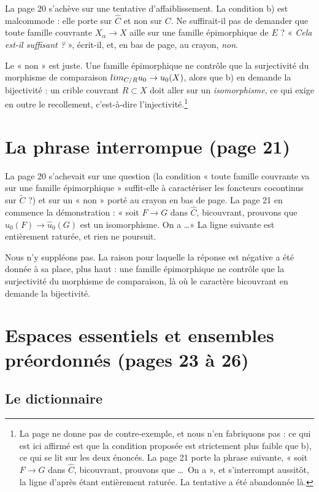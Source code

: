 \documentclass[11pt,a4paper]{article}
\begin{document}
La page 20 s'achève sur une tentative d'affaiblissement. La condition b) est
malcommode : elle porte sur $\widehat{C}$ et non sur $C$. Ne suffirait-il pas
de demander que toute famille couvrante $X_{\alpha} \to X$ aille sur une
famille épimorphique de $E$ ? « \emph{Cela est-il suffisant ?} », écrit-il,
et, en bas de page, au crayon, \emph{non}.

Le « non » est juste. Une famille épimorphique ne contrôle que la surjectivité
du morphisme de comparaison $\varinjlim_{C/R} u_{0} \to u_{0}(X)$, alors que
b) en demande la bijectivité : un crible couvrant $R \subset X$ doit aller sur
un \emph{isomorphisme}, ce qui exige en outre le recollement, c'est-à-dire
l'injectivité.\footnote{La page ne donne pas de contre-exemple, et nous n'en
fabriquons pas : ce qui est ici affirmé est que la condition proposée est
strictement plus faible que b), ce qui se lit sur les deux énoncés. La page 21
porte la phrase suivante, « soit $F \to G$ dans $\widehat{C}$,
bicouvrant, prouvons que \ldots\ On a », et s'interrompt aussitôt, la
ligne d'après étant entièrement raturée. La tentative a été abandonnée là.}

\section*{La phrase interrompue (page 21)}

La page 20 s'achevait sur une question (la condition « toute famille
couvrante va sur une famille épimorphique » suffit-elle à caractériser les
foncteurs cocontinus sur $\widetilde{C}$ ?) et sur un « non » porté au crayon
en bas de page. La page 21 en commence la démonstration : « soit
$F \to G$ dans $\widehat{C}$, bicouvrant, prouvons que
$\widehat{u}_{0}(F) \to \widehat{u}_{0}(G)$ est un isomorphisme. On a \ldots »
La ligne suivante est entièrement raturée, et rien ne poursuit.

Nous n'y suppléons pas. La raison pour laquelle la réponse est négative a été
donnée à sa place, plus haut : une famille épimorphique ne contrôle que la
surjectivité du morphisme de comparaison, là où le caractère bicouvrant en
demande la bijectivité.


\section*{Espaces essentiels et ensembles préordonnés (pages 23 à 26)}

\subsection*{Le dictionnaire}
\end{document}

